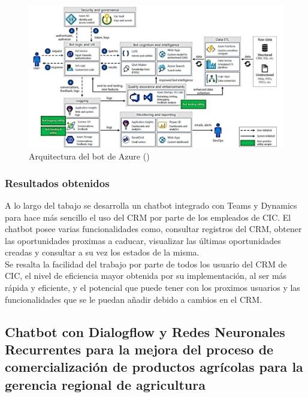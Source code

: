 \begin{figure}[h]
	\begin{center}
		\includegraphics[width=1\textwidth]{2/figures/2_3.png}
		\caption{Arquitectura del bot de Azure (\cite{ts_ICAITD})}
	\end{center}
\end{figure}

\subsubsection{Resultados obtenidos}
A lo largo del tabajo se desarrolla un chatbot integrado con Teams y Dynamics para hace más sencillo el uso del CRM por parte de los empleados de CIC. El chatbot posee varias funcionalidades como, consultar registros del CRM, obtener las oportunidades proximas a caducar, visualizar las últimas oportunidades creadas y consultar a su vez los estados de la misma. \\
Se resalta la facilidad del trabajo por parte de todos los usuario del CRM de CIC, el nivel de eficiencia mayor obtenida por su implementación, al ser más rápida y eficiente, y el potencial que puede tener con los proximos usuarios y las funcionalidades que se le puedan añadir debido a cambios en el CRM.


\subsection{Chatbot con Dialogflow y Redes Neuronales Recurrentes para la mejora del proceso de comercialización de productos agrícolas para la gerencia regional de agricultura \citep*{ts_CDRNRMPC}}


